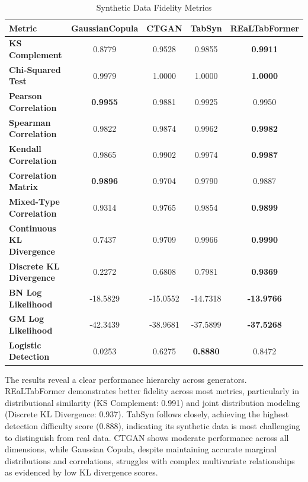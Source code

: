 \documentclass[conference]{IEEEtran}
\begin{document}
\begin{table}[!htbp]
\centering
\scriptsize
\setlength{\tabcolsep}{1pt}
\renewcommand{\arraystretch}{1.2}
\caption{Synthetic Data Fidelity Metrics}
\label{tab:fidelity_metrics}
\begin{tabular}{lcccc}
\toprule
\rowcolor{blue!15}
\textbf{Metric} & \textbf{GaussianCopula} & \textbf{CTGAN} & \textbf{TabSyn} & \textbf{REaLTabFormer} \\
\midrule
\rowcolor{gray!5}
\textbf{KS Complement} & 0.8779 & 0.9528 & 0.9855 & \textbf{0.9911} \\
\rowcolor{gray!20}
\textbf{Chi-Squared Test} & 0.9979 & 1.0000 & 1.0000 & \textbf{1.0000} \\
\rowcolor{gray!5}
\textbf{Pearson Correlation} & \textbf{0.9955} & 0.9881 & 0.9925 & 0.9950 \\
\rowcolor{gray!20}
\textbf{Spearman Correlation} & 0.9822 & 0.9874 & 0.9962 & \textbf{0.9982} \\
\rowcolor{gray!5}
\textbf{Kendall Correlation} & 0.9865 & 0.9902 & 0.9974 & \textbf{0.9987} \\
\rowcolor{gray!20}
\textbf{Correlation Matrix} & \textbf{0.9896} & 0.9704 & 0.9790 & 0.9887 \\
\rowcolor{gray!5}
\textbf{Mixed-Type Correlation} & 0.9314 & 0.9765 & 0.9854 & \textbf{0.9899} \\
\rowcolor{gray!20}
\textbf{Continuous KL Divergence} & 0.7437 & 0.9709 & 0.9966 & \textbf{0.9990} \\
\rowcolor{gray!5}
\textbf{Discrete KL Divergence} & 0.2272 & 0.6808 & 0.7981 & \textbf{0.9369} \\
\rowcolor{gray!20}
\textbf{BN Log Likelihood} & -18.5829 & -15.0552 & -14.7318 & \textbf{-13.9766} \\
\rowcolor{gray!5}
\textbf{GM Log Likelihood} & -42.3439 & -38.9681 & -37.5899 & \textbf{-37.5268} \\
\rowcolor{gray!20}
\textbf{Logistic Detection} & 0.0253 & 0.6275 & \textbf{0.8880} & 0.8472 \\
\bottomrule
\end{tabular}
\end{table}

The results reveal a clear performance hierarchy across generators. REaLTabFormer demonstrates better fidelity across most metrics, particularly in distributional similarity (KS Complement: 0.991) and joint distribution modeling (Discrete KL Divergence: 0.937). TabSyn follows closely, achieving the highest detection difficulty score (0.888), indicating its synthetic data is most challenging to distinguish from real data. CTGAN shows moderate performance across all dimensions, while Gaussian Copula, despite maintaining accurate marginal distributions and correlations, struggles with complex multivariate relationships as evidenced by low KL divergence scores.
\end{document}
